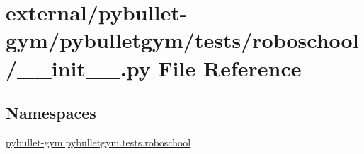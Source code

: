 \hypertarget{external_2pybullet-gym_2pybulletgym_2tests_2roboschool_2____init_____8py}{}\section{external/pybullet-\/gym/pybulletgym/tests/roboschool/\+\_\+\+\_\+init\+\_\+\+\_\+.py File Reference}
\label{external_2pybullet-gym_2pybulletgym_2tests_2roboschool_2____init_____8py}
\subsection*{Namespaces}
\begin{DoxyCompactItemize}
\item 
 \hyperlink{namespacepybullet-gym_1_1pybulletgym_1_1tests_1_1roboschool}{pybullet-\/gym.\+pybulletgym.\+tests.\+roboschool}
\end{DoxyCompactItemize}
